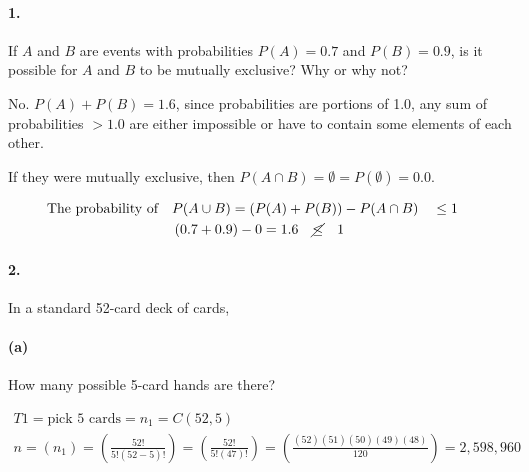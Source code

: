 

\renewcommand\assignment{Worksheet 5, due Monday January 30, 4:15pm}


    \paragraph*{1.}
    If $A$ and $B$ are events with probabilities $P (A) = 0.7$ and $P (B) = 0.9$, is it possible for $A$ and $B$ to be mutually exclusive? Why or why not?
    
    \begin{mdframed}
        No. $P(A) + P(B) = 1.6$, since probabilities are portions of 1.0, any sum of probabilities $> 1.0$ are either impossible or have to contain some elements of each other.

        If they were mutually exclusive, then $P(A \cap B) = \emptyset = P(\emptyset) = 0.0$.

        \begin{equation*}
            \begin{gathered}
                \text{The probability of} \quad P(A \cup B) = (P(A) + P(B)) - P(A \cap B) \quad \leq 1 \quad    \\
                (0.7 + 0.9) - 0 = 1.6 \quad \cancel{\leq} \quad 1
            \end{gathered}
        \end{equation*}
        
        
    \end{mdframed}

    \paragraph*{2.}
    In a standard 52-card deck of cards,

    \paragraph*{(a)}
    How many possible 5-card hands are there?

    \begin{mdframed}
        \begin{equation*}
            \begin{gathered}
                T1 = \text{pick 5 cards} = n_1  = C(52,5)  \\
                n = (n_1) = \left(\frac{52!}{5!(52-5)!}\right) = \left(\frac{52!}{5!(47)!}\right) = \left(\frac{(52)(51)(50)(49)(48)}{120}\right) = \boxed{2,598,960}
            \end{gathered}
        \end{equation*}
    \end{mdframed}

